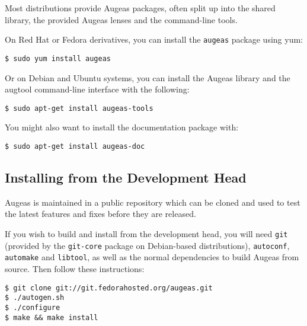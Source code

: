 
Most distributions provide Augeas packages, often split up into the shared library, the provided Augeas lenses and the command-line tools.

On Red Hat or Fedora derivatives, you can install the \verb!augeas! package using yum:

\begin{verbatim}
$ sudo yum install augeas
\end{verbatim}

Or on Debian and Ubuntu systems, you can install the Augeas library and the augtool command-line interface with the following:

\begin{verbatim}
$ sudo apt-get install augeas-tools
\end{verbatim}

You might also want to install the documentation package with:

\begin{verbatim}
$ sudo apt-get install augeas-doc
\end{verbatim}

\subsection{Installing from the Development Head}


Augeas is maintained in a public repository which can be cloned and used to test the latest features and fixes before they are released.

If you wish to build and install from the development head, you will need \verb!git! (provided by the \verb!git-core! package on Debian-based distributions), \verb!autoconf!, \verb!automake! and \verb!libtool!, as well as the normal dependencies to build Augeas from source. Then follow these instructions:

\begin{verbatim}
$ git clone git://git.fedorahosted.org/augeas.git
$ ./autogen.sh
$ ./configure
$ make && make install
\end{verbatim}
